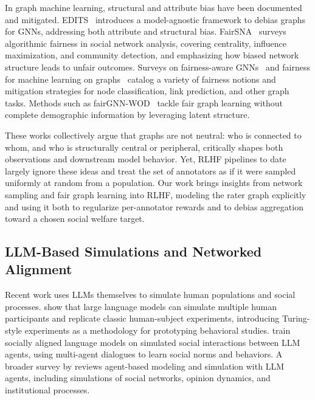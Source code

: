 \documentclass{article}
\theoremstyle{plain}
\theoremstyle{definition}
\theoremstyle{remark}
\begin{document}
In graph machine learning, structural and attribute bias have been documented and mitigated.
EDITS~\citep{dong2021edits} introduces a model-agnostic framework to debias graphs for GNNs, addressing both attribute and structural bias.
FairSNA~\citep{saxena2024fairsna} surveys algorithmic fairness in social network analysis, covering centrality, influence maximization, and community detection, and emphasizing how biased network structure leads to unfair outcomes.
Surveys on fairness-aware GNNs~\citep{chen2023fairgnn_survey} and fairness for machine learning on graphs~\citep{laclau2024fairness_graphs_survey} catalog a variety of fairness notions and mitigation strategies for node classification, link prediction, and other graph tasks.
Methods such as fairGNN-WOD~\citep{wang2025fairgnn_wod} tackle fair graph learning without complete demographic information by leveraging latent structure.

These works collectively argue that graphs are not neutral: who is connected to whom, and who is structurally central or peripheral, critically shapes both observations and downstream model behavior.
Yet, RLHF pipelines to date largely ignore these ideas and treat the set of annotators as if it were sampled uniformly at random from a population.
Our work brings insights from network sampling and fair graph learning into RLHF, modeling the rater graph explicitly and using it both to regularize per-annotator rewards and to debias aggregation toward a chosen social welfare target.

\subsection{LLM-Based Simulations and Networked Alignment}
\label{sec:rw_simulation}

Recent work uses LLMs themselves to simulate human populations and social processes.
\citet{aher2023turingexperiments} show that large language models can simulate multiple human participants and replicate classic human-subject experiments, introducing Turing-style experiments as a methodology for prototyping behavioral studies.
\citet{liu2023socially_aligned} train socially aligned language models on simulated social interactions between LLM agents, using multi-agent dialogues to learn social norms and behaviors.
A broader survey by \citet{gao2024llm_abm_survey} reviews agent-based modeling and simulation with LLM agents, including simulations of social networks, opinion dynamics, and institutional processes.
\end{document}
